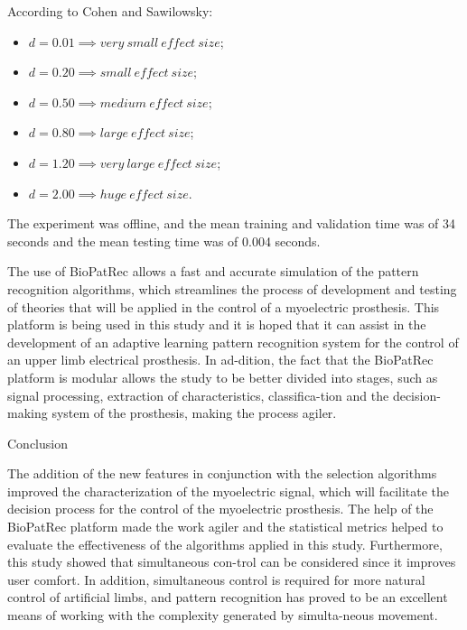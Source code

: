 \documentclass[a4paper, 12pt]{ppgeb}
\makeatletter
\renewcommand{\section}{\@startsection
{section}
{1}
{0mm}
{-\baselineskip}
{0.5\baselineskip}
{\large\bfseries\scshape}}
\makeatother
\begin{document}
According to Cohen and Sawilowsky:
\begin{itemize}
    \item $d = 0.01 \implies very \:small \:effect \:size$;
    \item $d = 0.20 \implies small \:effect \:size$;
    \item $d = 0.50 \implies medium \:effect \:size$;
    \item $d = 0.80 \implies large \:effect \:size$;
    \item $d = 1.20 \implies very \:large \:effect \:size$;
    \item $d = 2.00 \implies huge \:effect \:size$.
\end{itemize}

The experiment was offline, and the mean training and validation time was of 34 seconds and the mean testing time was of 0.004 seconds.

The use of BioPatRec allows a fast and accurate simulation of the pattern recognition algorithms, which streamlines the process of development and testing of theories that will be applied in the control of a myoelectric prosthesis. This platform is being used in this study and it is hoped that it can assist in the development of an adaptive learning pattern recognition system for the control of an upper limb electrical prosthesis. In ad-dition, the fact that the BioPatRec platform is modular allows the study to be better divided into stages, such as signal processing, extraction of characteristics, classifica-tion and the decision-making system of the prosthesis, making the process agiler.

\section{Conclusion}

The addition of the new features in conjunction with the selection algorithms improved the characterization of the myoelectric signal, which will facilitate the decision process for the control of the myoelectric prosthesis. The help of the BioPatRec platform made the work agiler and the statistical metrics helped to evaluate the effectiveness of the algorithms applied in this study. Furthermore, this study showed that simultaneous con-trol can be considered since it improves user comfort. In addition, simultaneous control is required for more natural control of artificial limbs, and pattern recognition has proved to be an excellent means of working with the complexity generated by simulta-neous movement.
\end{document}
